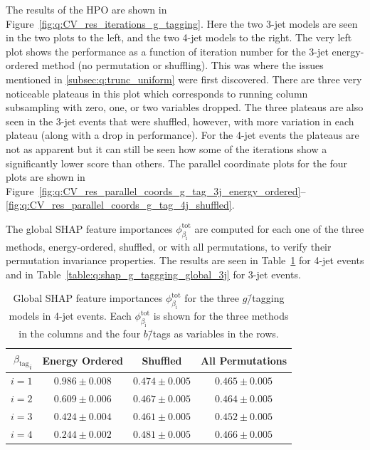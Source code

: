 The results of the HPO are shown in Figure~\ref{fig:q:CV_res_iterations_g_tagging}. Here the two 3-jet models are seen in the two plots to the left, and the two 4-jet models to the right. The very left plot shows the performance as a function of iteration number for the 3-jet energy-ordered method (no permutation or shuffling). This was where the issues mentioned in \autoref{subsec:q:trunc_uniform} were first discovered. There are three very noticeable plateaus in this plot which corresponds to running column subsampling with zero, one, or two variables dropped. The three plateaus are also seen in the 3-jet events that were shuffled, however, with more variation in each plateau (along with a drop in performance). For the 4-jet events the plateaus are not as apparent but it can still be seen how some of the iterations show a significantly lower score than others. The parallel coordinate plots for the four plots are shown in Figure~\ref{fig:q:CV_res_parallel_coords_g_tag_3j_energy_ordered}--\ref{fig:q:CV_res_parallel_coords_g_tag_4j_shuffled}.

The global SHAP feature importances $\phi^\mathrm{tot}_{\beta_\mathrm{i}}$ are computed for each one of the three methods, energy-ordered, shuffled, or with all permutations, to verify their permutation invariance properties. The results are seen in Table~\ref{table:q:shap_g_taggging_global_4j} for 4-jet events and in Table~\ref{table:q:shap_g_taggging_global_3j} for 3-jet events. 

\begin{table}[h!]
  \centerfloat
  \begin{tabular}{@{}rccc@{}}
  ${\beta_\mathrm{tag}}_i$  & Energy Ordered & Shuffled & All Permutations \\ \midrule
  $i=1$ & $ 0.986 \pm 0.008 $  &  $ 0.474 \pm 0.005 $  &  $ 0.465 \pm 0.005 $  \\
  $i=2$ & $ 0.609 \pm 0.006 $  &  $ 0.467 \pm 0.005 $  &  $ 0.464 \pm 0.005 $  \\
  $i=3$ & $ 0.424 \pm 0.004 $  &  $ 0.461 \pm 0.005 $  &  $ 0.452 \pm 0.005 $  \\
  $i=4$ & $ 0.244 \pm 0.002 $  &  $ 0.481 \pm 0.005 $  &  $ 0.466 \pm 0.005 $  \\ 
  \end{tabular}
  \caption[Global SHAP Feature Importances for the $g$\=/Tagging Models in 4-Jet Events]{Global SHAP feature importances $\phi^\mathrm{tot}_{\beta_\mathrm{i}}$ for the three $g$\=/tagging models in 4-jet events. Each $\phi^\mathrm{tot}_{\beta_\mathrm{i}}$ is shown for the three methods in the columns and the four $b$\=/tags as variables in the rows.}
  \label{table:q:shap_g_taggging_global_4j}
\end{table}
\vspace{2mm}

